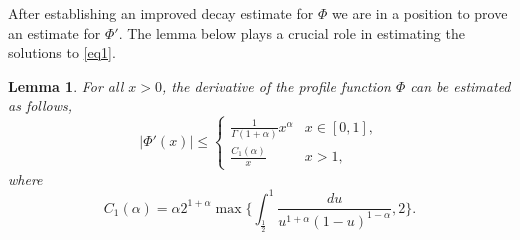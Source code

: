 \documentclass{article}
\newtheorem{lemma}{Lemma}
\begin{document}
After establishing an improved decay estimate for $\Phi$ we are in a position to prove an  estimate for $\Phi'$.
The lemma below plays a crucial role in  estimating  the solutions to \eqref{eq1}.
\begin{lemma}\label{l4}
For all $x>0$, the derivative of the profile function $\Phi$ can be %
estimated as follows,
\begin{equation}\label{poch}
|\Phi'(x)|\leq 
\left\{
\begin{array}{cc}
 \frac1{\Gamma(1+\alpha)} x^\alpha    &  x\in [0, 1], \\
 \frac{C_1(\alpha)}{x}&  x>1,
\end{array}
\right.
\end{equation}
where 
$$
C_1(\alpha) = \alpha 2^{1+\alpha}\max\bigg\{\int_{\frac12}^1 \frac{du}{ u^{1+\alpha}(1-u)^{1-\alpha}}, 2\bigg\}.
$$
\end{lemma}
\end{document}
